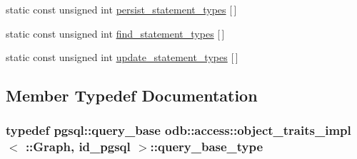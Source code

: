 \begin{DoxyCompactItemize}
\item 
static const unsigned int \hyperlink{classodb_1_1access_1_1object__traits__impl_3_01_1_1_graph_00_01id__pgsql_01_4_abeff2ec99849c59c296e4a9441332a4e}{persist\+\_\+statement\+\_\+types} \mbox{[}$\,$\mbox{]}
\item 
static const unsigned int \hyperlink{classodb_1_1access_1_1object__traits__impl_3_01_1_1_graph_00_01id__pgsql_01_4_a296c219d407cc83656f074989d28439c}{find\+\_\+statement\+\_\+types} \mbox{[}$\,$\mbox{]}
\item 
static const unsigned int \hyperlink{classodb_1_1access_1_1object__traits__impl_3_01_1_1_graph_00_01id__pgsql_01_4_a1e7b0e1215153564fa1333adafb180a1}{update\+\_\+statement\+\_\+types} \mbox{[}$\,$\mbox{]}
\end{DoxyCompactItemize}


\subsection{Member Typedef Documentation}
\hypertarget{classodb_1_1access_1_1object__traits__impl_3_01_1_1_graph_00_01id__pgsql_01_4_a6d91ed0e32ffb82b1f1d7bd71da6526f}{}
\subsubsection[{query\+\_\+base\+\_\+type}]{\setlength{\rightskip}{0pt plus 5cm}typedef pgsql\+::query\+\_\+base odb\+::access\+::object\+\_\+traits\+\_\+impl$<$ \+::{\bf Graph}, id\+\_\+pgsql $>$\+::{\bf query\+\_\+base\+\_\+type}}\label{classodb_1_1access_1_1object__traits__impl_3_01_1_1_graph_00_01id__pgsql_01_4_a6d91ed0e32ffb82b1f1d7bd71da6526f}
\hypertarget{classodb_1_1access_1_1object__traits__impl_3_01_1_1_graph_00_01id__pgsql_01_4_a5554ddaea23c61328234f3a79ed49cb1}{}
